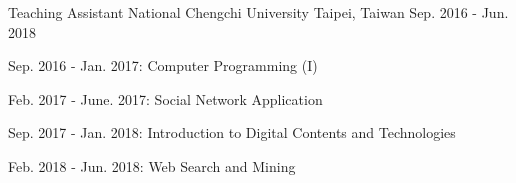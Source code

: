 \begin{cventries}
	\cventry
	{Teaching Assistant} %
	{National Chengchi University} %
	{Taipei, Taiwan} %
	{Sep. 2016 - Jun. 2018} %
	{
		\begin{cvitems} %
			\item {Sep. 2016 - Jan. 2017: Computer Programming (I)}
			\item {Feb. 2017 - June. 2017: Social Network Application}
			\item {Sep. 2017 - Jan. 2018: Introduction to Digital Contents and Technologies}
			\item {Feb. 2018 - Jun. 2018: Web Search and Mining}
		\end{cvitems}
	}

\end{cventries}
